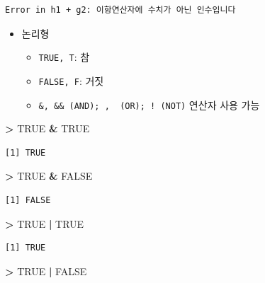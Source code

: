 \documentclass[12pt,a4paper]{book}
\newenvironment{Shaded}{\begin{snugshade}}{\end{snugshade}}
\newcommand{\StringTok}[1]{\textcolor[rgb]{0.31,0.60,0.02}{#1}}
\newcommand{\OtherTok}[1]{\textcolor[rgb]{0.56,0.35,0.01}{#1}}
\newcommand{\OperatorTok}[1]{\textcolor[rgb]{0.81,0.36,0.00}{\textbf{#1}}}
\providecommand{\tightlist}{%
  \setlength{\itemsep}{0pt}\setlength{\parskip}{0pt}}
\theoremstyle{definition}
\theoremstyle{definition}
\theoremstyle{definition}
\theoremstyle{remark}
\begin{document}
\begin{verbatim}
Error in h1 + g2: 이항연산자에 수치가 아닌 인수입니다
\end{verbatim}

\begin{itemize}
\tightlist
\item
  논리형

  \begin{itemize}
  \tightlist
  \item
    \texttt{TRUE,\ T}: 참
  \item
    \texttt{FALSE,\ F}: 거짓
  \item
    \texttt{\&,\ \&\&\ (AND);\ \textbar{},\ \textbar{}\textbar{}\ (OR);\ !\ (NOT)}
    연산자 사용 가능
  \end{itemize}
\end{itemize}

\begin{Shaded}
\begin{Highlighting}[]
\OperatorTok{>}\StringTok{ }\OtherTok{TRUE} \OperatorTok{&}\StringTok{ }\OtherTok{TRUE}
\end{Highlighting}
\end{Shaded}

\begin{verbatim}
[1] TRUE
\end{verbatim}

\begin{Shaded}
\begin{Highlighting}[]
\OperatorTok{>}\StringTok{ }\OtherTok{TRUE} \OperatorTok{&}\StringTok{ }\OtherTok{FALSE}
\end{Highlighting}
\end{Shaded}

\begin{verbatim}
[1] FALSE
\end{verbatim}

\begin{Shaded}
\begin{Highlighting}[]
\OperatorTok{>}\StringTok{ }\OtherTok{TRUE} \OperatorTok{|}\StringTok{ }\OtherTok{TRUE}
\end{Highlighting}
\end{Shaded}

\begin{verbatim}
[1] TRUE
\end{verbatim}

\begin{Shaded}
\begin{Highlighting}[]
\OperatorTok{>}\StringTok{ }\OtherTok{TRUE} \OperatorTok{|}\StringTok{ }\OtherTok{FALSE}
\end{Highlighting}
\end{Shaded}
\end{document}
